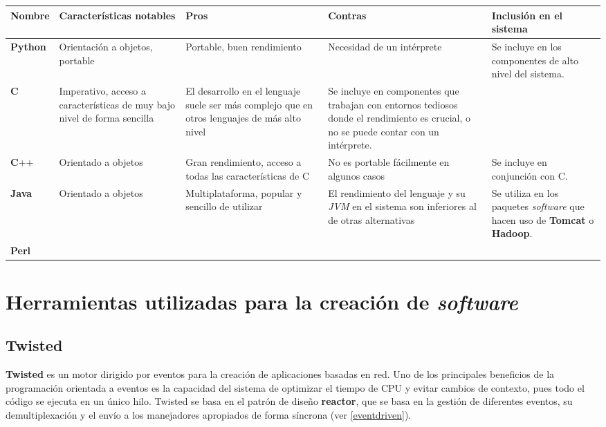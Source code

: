 \begin{landscape}
\begin{table}[H]
\begin{tabular}{|p{1.5cm}|p{4.2cm}|p{4.2cm}|p{4.2cm}|p{4.2cm}|}
\hline
Nombre & Características notables & Pros & Contras & Inclusión en el sistema\\ \hline

\textbf{Python} & Orientación a objetos, portable & Portable, buen rendimiento & Necesidad de un intérprete & Se incluye en los componentes de alto nivel del sistema.\\ \hline

\textbf{C} & Imperativo, acceso a características de muy bajo nivel de forma sencilla & El desarrollo en el lenguaje suele ser más complejo que en otros lenguajes de más alto nivel & Se incluye en componentes que trabajan con entornos tediosos donde el rendimiento es crucial, o no se puede contar con un intérprete. & \\ \hline

\textbf{C}++ & Orientado a objetos & Gran rendimiento, acceso a todas las características de C & No es portable fácilmente en algunos casos & Se incluye en conjunción con C.\\ \hline

\textbf{Java} & Orientado a objetos & Multiplataforma, popular y sencillo de utilizar & El rendimiento del lenguaje y su \textit{JVM} en el sistema son inferiores al de otras alternativas & Se utiliza en los paquetes \textit{software} que hacen uso de \textbf{Tomcat} o \textbf{Hadoop}.\\ \hline
\textbf{Perl} & & & & \\ \hline
\end{tabular}
\end{table}
\end{landscape}

\section{Herramientas utilizadas para la creación de \textit{software}}

\subsection{Twisted}

\textbf{Twisted}  es un motor dirigido por eventos para la creación de aplicaciones basadas en red. Uno de los principales beneficios de la programación orientada a eventos es la capacidad del sistema de optimizar el tiempo de CPU y evitar cambios de contexto, pues todo el código se ejecuta en un único hilo. Twisted se basa en el patrón de diseño \textbf{reactor}\cite{Coplien95reactor}, que se basa en la gestión de diferentes eventos, su demultiplexación y el envío a los manejadores apropiados de forma síncrona (ver \ref{eventdriven}).

